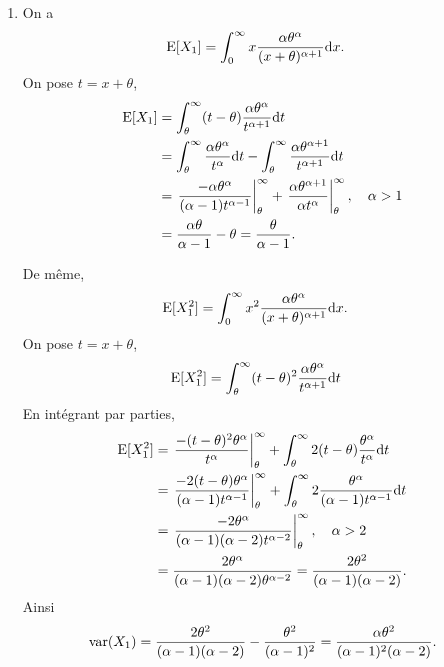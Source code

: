 \begin{solution}{4.12}
\begin{enumerate}
\item On a
\begin{align*}
\operatorname{E}[X_1]&=\int_0^\infty x \frac{\alpha\theta^\alpha}{(x+\theta)^{\alpha+1}}\mbox{d} x.
\end{align*}
On pose $t=x+\theta$,
\begin{align*}
\operatorname{E}[X_1] &= \int_\theta^\infty (t-\theta) \frac{\alpha\theta^\alpha}{t^{\alpha+1}}\mbox{d} t\\
&=\int_\theta^\infty \frac{\alpha\theta^\alpha}{t^{\alpha}}\mbox{d} t-\int_\theta^\infty \frac{\alpha\theta^{\alpha+1}}{t^{\alpha+1}}\mbox{d} t\\
&= \left.\frac{-\alpha\theta^\alpha}{(\alpha-1)t^{\alpha-1}}\right|_\theta^\infty+ \left.\frac{\alpha\theta^{\alpha+1}}{\alpha t^{\alpha}}\right|_\theta^\infty, \quad \alpha>1\\
&=\frac{\alpha\theta}{\alpha-1}-\theta = \frac{\theta}{\alpha-1}.
\end{align*}

De même,
\begin{align*}
\operatorname{E}[X_1^2]&=\int_0^\infty x^2 \frac{\alpha\theta^\alpha}{(x+\theta)^{\alpha+1}}\mbox{d} x.
\end{align*}
On pose $t=x+\theta$,
\begin{align*}
\operatorname{E}[X_1^2]&=\int_\theta^\infty (t-\theta)^2 \frac{\alpha\theta^\alpha}{t^{\alpha+1}}\mbox{d} t
\end{align*}
En intégrant par parties,
\begin{align*}
\operatorname{E}[X_1^2]&= \left.\frac{-(t-\theta)^2\theta^\alpha}{t^{\alpha}}\right|_\theta^\infty+ \int_\theta^\infty 2(t-\theta)\frac{\theta^{\alpha}}{ t^{\alpha}}\mbox{d} t\\
&=\left.\frac{-2(t-\theta)\theta^\alpha}{(\alpha-1)t^{\alpha-1}}\right|_\theta^\infty+ \int_\theta^\infty 2\frac{\theta^{\alpha}}{ (\alpha-1)t^{\alpha-1}}\mbox{d} t\\
&=\left.\frac{-2\theta^\alpha}{(\alpha-1)(\alpha-2)t^{\alpha-2}}\right|_\theta^\infty, \quad \alpha>2\\
&=\frac{2\theta^\alpha}{(\alpha-1)(\alpha-2)\theta^{\alpha-2}}= \frac{2\theta^2}{(\alpha-1)(\alpha-2)}.
\end{align*}
Ainsi
$$
\operatorname{var}(X_1)=\frac{2\theta^2}{(\alpha-1)(\alpha-2)}-\frac{\theta^2}{(\alpha-1)^2}=\frac{\alpha\theta^2}{(\alpha-1)^2(\alpha-2)}.
$$


\end{enumerate}
\end{solution}
